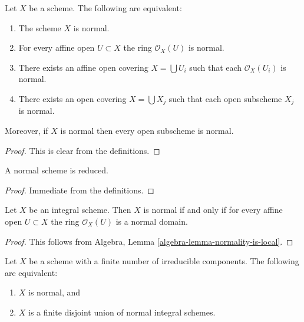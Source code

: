 \begin{lemma}
\label{lemma-locally-normal}
Let $X$ be a scheme. The following are equivalent:
\begin{enumerate}
\item The scheme $X$ is normal.
\item For every affine open $U \subset X$ the ring $\mathcal{O}_X(U)$
is normal.
\item There exists an affine open covering $X = \bigcup U_i$ such that
each $\mathcal{O}_X(U_i)$ is normal.
\item There exists an open covering $X = \bigcup X_j$
such that each open subscheme $X_j$ is normal.
\end{enumerate}
Moreover, if $X$ is normal then every open subscheme
is normal.
\end{lemma}

\begin{proof}
This is clear from the definitions.
\end{proof}

\begin{lemma}
\label{lemma-normal-reduced}
A normal scheme is reduced.
\end{lemma}

\begin{proof}
Immediate from the definitions.
\end{proof}

\begin{lemma}
\label{lemma-integral-normal}
Let $X$ be an integral scheme.
Then $X$ is normal if and only if for every affine open
$U \subset X$ the ring $\mathcal{O}_X(U)$ is a normal domain.
\end{lemma}

\begin{proof}
This follows from
Algebra, Lemma \ref{algebra-lemma-normality-is-local}.
\end{proof}

\begin{lemma}
\label{lemma-normal-locally-finite-nr-irreducibles}
Let $X$ be a scheme with a finite number of irreducible components.
The following are equivalent:
\begin{enumerate}
\item $X$ is normal, and
\item $X$ is a finite disjoint union of normal integral schemes.
\end{enumerate}
\end{lemma}

